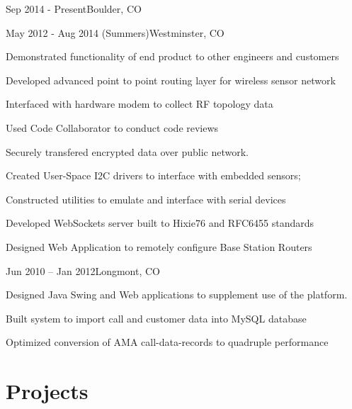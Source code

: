 \documentclass[letterpaper]{deedy-resume}
\begin{document}
\begin{minipage}[t]{0.66\textwidth}
     {Sep 2014 - Present}{Boulder, CO}{}

     {May 2012 - Aug 2014 (Summers)}{Westminster, CO}{%
        \begin{tightitemize}
        \item Demonstrated functionality of end product to other engineers and customers
        \item Developed advanced point to point routing layer for wireless sensor network
        \item Interfaced with hardware modem to collect RF topology data
        \item Used Code Collaborator to conduct code reviews
        \item Securely transfered encrypted data over public network.
        \item Created User-Space I2C drivers to interface with embedded sensors;
        \item Constructed utilities to emulate and interface with serial devices
        \item Developed WebSockets server built to Hixie76 and RFC6455 standards
        \item Designed Web Application to remotely configure Base Station Routers
        \end{tightitemize}
}

     {Jun 2010 – Jan 2012}{Longmont, CO}{%
        \begin{tightitemize}
        \item Designed Java Swing and Web applications to supplement use of the platform.
        \item Built system to import call and customer data into MySQL database
        \item Optimized conversion of AMA call-data-records to quadruple performance
        \end{tightitemize}
}

\sectionspace
\section{Projects}



\end{minipage}
\end{document}
